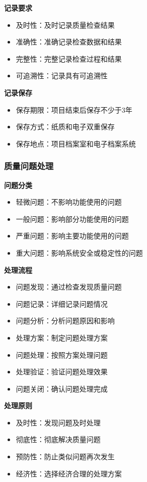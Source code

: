 \documentclass[UTF8,a4paper,12pt]{article}
\begin{document}
\textbf{记录要求}
\begin{itemize}
    \item 及时性：及时记录质量检查结果
    \item 准确性：准确记录检查数据和结果
    \item 完整性：完整记录检查过程和结果
    \item 可追溯性：记录具有可追溯性
\end{itemize}

\textbf{记录保存}
\begin{itemize}
    \item 保存期限：项目结束后保存不少于3年
    \item 保存方式：纸质和电子双重保存
    \item 保存地点：项目档案室和电子档案系统
\end{itemize}

\subsubsection{质量问题处理}
\textbf{问题分类}
\begin{itemize}
    \item 轻微问题：不影响功能使用的问题
    \item 一般问题：影响部分功能使用的问题
    \item 严重问题：影响主要功能使用的问题
    \item 重大问题：影响系统安全或稳定性的问题
\end{itemize}

\textbf{处理流程}
\begin{itemize}
    \item 问题发现：通过检查发现质量问题
    \item 问题记录：详细记录问题情况
    \item 问题分析：分析问题原因和影响
    \item 处理方案：制定问题处理方案
    \item 问题处理：按照方案处理问题
    \item 处理验证：验证问题处理效果
    \item 问题关闭：确认问题处理完成
\end{itemize}

\textbf{处理原则}
\begin{itemize}
    \item 及时性：发现问题及时处理
    \item 彻底性：彻底解决质量问题
    \item 预防性：防止类似问题再次发生
    \item 经济性：选择经济合理的处理方案
\end{itemize}
\end{document}
